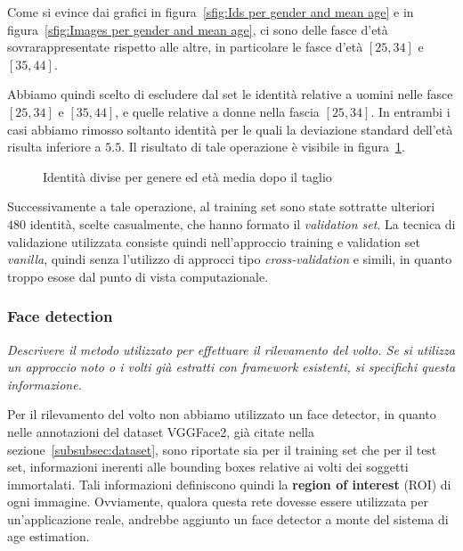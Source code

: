 Come si evince dai grafici in figura~\ref{sfig:Ids per gender and mean age} e in figura~\ref{sfig:Images per gender and mean age}, ci sono delle fasce d'età sovrarappresentate rispetto alle altre, in particolare le fasce d'età $[25,34]$ e $[35,44]$.

Abbiamo quindi scelto di escludere dal set le identità relative a uomini nelle fasce $[25,34]$ e $[35,44]$, e quelle relative a donne nella fascia $[25,34]$. In entrambi i casi abbiamo rimosso soltanto identità per le quali la deviazione standard dell'età risulta inferiore a $5.5$. Il risultato di tale operazione è visibile in figura~\ref{fig:Ids per gender and mean age after the drop}.

\begin{figure}[ht]
\centering
\def\svgscale{0.7}

\caption{Identità divise per genere ed età media dopo il taglio}
\label{fig:Ids per gender and mean age after the drop}
\end{figure}

Successivamente a tale operazione, al training set sono state sottratte ulteriori $480$ identità, scelte casualmente, che hanno formato il \emph{validation set}. La tecnica di validazione utilizzata consiste quindi nell'approccio training e validation set \emph{vanilla}, quindi senza l'utilizzo di approcci tipo \emph{cross-validation} e simili, in quanto troppo esose dal punto di vista computazionale.

\subsubsection{Face detection}
\label{subsubsec:face_detection}

\emph{Descrivere il metodo utilizzato per effettuare il rilevamento del volto. Se si utilizza un approccio noto o i volti già estratti con framework esistenti, si specifichi questa informazione.}

Per il rilevamento del volto non abbiamo utilizzato un face detector, in quanto nelle annotazioni del dataset VGGFace2, già citate nella sezione~\ref{subsubsec:dataset}, sono riportate sia per il training set che per il test set, informazioni inerenti alle bounding boxes relative ai volti dei soggetti immortalati. Tali informazioni definiscono quindi la \textbf{region of interest} (ROI) di ogni immagine.
Ovviamente, qualora questa rete dovesse essere utilizzata per un'applicazione reale, andrebbe aggiunto un face detector a monte del sistema di age estimation. 

